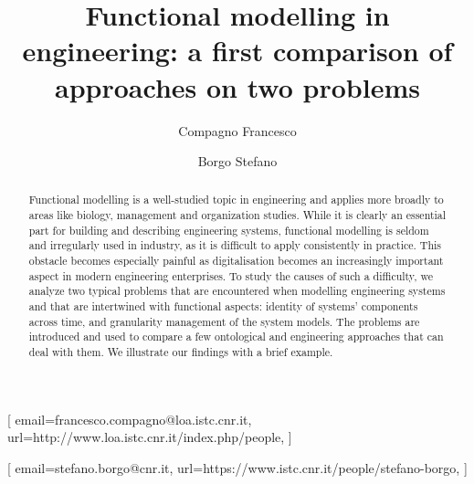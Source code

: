 \documentclass[
]{ceurart}
\begin{document}


\title{Functional modelling in engineering: a first comparison of approaches on two problems}


\author[1,2]{Compagno Francesco}[%
email=francesco.compagno@loa.istc.cnr.it,
url=http://www.loa.istc.cnr.it/index.php/people,
]
\cormark[1]
\address[1]{ISTC-CNR Laboratory for Applied Ontology, via alla cascata 56/C, 38123, Povo, Italy}
\address[2]{Adige S.P.A, via per Barco, 11, Levico Terme, 38056, Italy}

\author[1]{Borgo Stefano}[%
email=stefano.borgo@cnr.it,
url=https://www.istc.cnr.it/people/stefano-borgo,
]



\begin{abstract}
  Functional modelling is a well-studied topic in engineering and applies more broadly to areas like biology, management and organization studies. 
  While it is clearly an essential part for building and describing engineering systems,
  functional modelling is seldom and irregularly used in industry, as it is difficult to apply consistently in practice.
  This obstacle becomes especially painful as digitalisation becomes an increasingly important aspect in modern engineering enterprises.
  To study the causes of such a difficulty, we analyze two typical problems that are encountered when modelling engineering systems and that are intertwined with functional aspects: identity of systems' components across time, and granularity management of the system models.
  The problems are introduced and used to compare a few ontological and engineering approaches that can deal with them.
  We illustrate our findings with a brief example.
\end{abstract}
\end{document}
